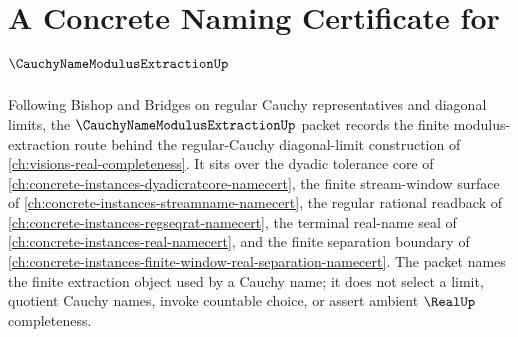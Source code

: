 \chapter{A Concrete Naming Certificate for $\CauchyNameModulusExtractionUp$}
\label{ch:concrete-instances-cauchy-name-modulus-extraction-namecert}

Following Bishop and Bridges on regular Cauchy representatives and diagonal limits, the $\CauchyNameModulusExtractionUp$ packet records the finite modulus-extraction route behind the regular-Cauchy diagonal-limit construction of \autoref{ch:visions-real-completeness}. It sits over the dyadic tolerance core of \autoref{ch:concrete-instances-dyadicratcore-namecert}, the finite stream-window surface of \autoref{ch:concrete-instances-streamname-namecert}, the regular rational readback of \autoref{ch:concrete-instances-regseqrat-namecert}, the terminal real-name seal of \autoref{ch:concrete-instances-real-namecert}, and the finite separation boundary of \autoref{ch:concrete-instances-finite-window-real-separation-namecert}. The packet names the finite extraction object used by a Cauchy name; it does not select a limit, quotient Cauchy names, invoke countable choice, or assert ambient $\RealUp$ completeness.


